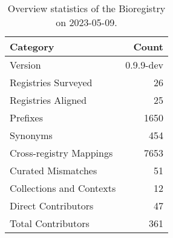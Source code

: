 \begin{table}
\caption{Overview statistics of the Bioregistry on 2023-05-09.}
\label{tab:bioregistry-summary}
\begin{tabular}{lr}
\toprule
Category & Count \\
\midrule
Version & 0.9.9-dev \\
Registries Surveyed & 26 \\
Registries Aligned & 25 \\
Prefixes & 1650 \\
Synonyms & 454 \\
Cross-registry Mappings & 7653 \\
Curated Mismatches & 51 \\
Collections and Contexts & 12 \\
Direct Contributors & 47 \\
Total Contributors & 361 \\
\bottomrule
\end{tabular}
\end{table}
